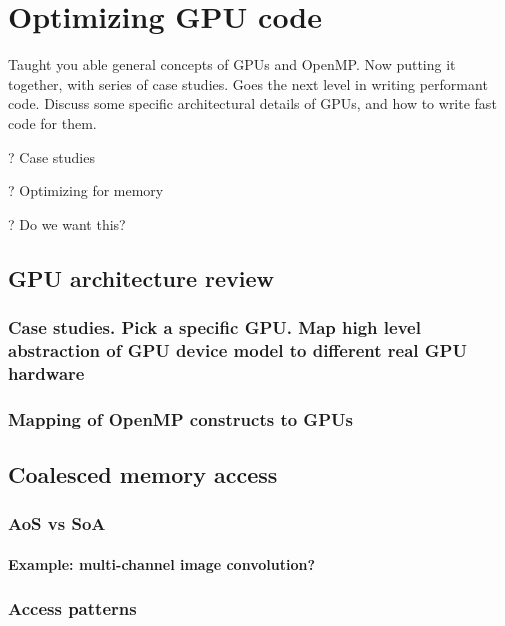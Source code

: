 
%
%
\chapter{Optimizing GPU code}
\label{chapter:optimizing}

Taught you able general concepts of GPUs and OpenMP.
Now putting it together, with series of case studies.
Goes the next level in writing performant code.
Discuss some specific architectural details of GPUs, and how to write fast code for them.

? Case studies

? Optimizing for memory

? Do we want this?

\section{GPU architecture review}
\subsection{Case studies. Pick a specific GPU. Map high level abstraction of GPU device model to different real GPU hardware}
\subsection{Mapping of OpenMP constructs to GPUs}

%
%

\section{Coalesced memory access}
\subsection{AoS vs SoA}
\subsubsection{Example: multi-channel image convolution?}

\subsection{Access patterns}
